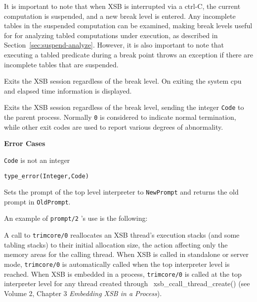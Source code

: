 \begin{description}
It is important to note that when XSB is interrupted via a ctrl-C, the
current computation is suspended, and a new break level is entered.
Any incomplete tables in the suspended computation can be examined,
making break levels useful for for analyzing tabled computations under
execution, as described in Section~\ref{sec:suspend-analyze}.
However, it is also important to note that executing a tabled
predicate during a break point throws an exception if there are
incomplete tables that are suspended.



%
    Exits the XSB session regardless of the break level.  On exiting
    the system cpu and elapsed time information is displayed.

%
Exits the XSB session regardless of the break level, sending the
integer {\tt Code} to the parent process.  Normally {\tt 0} is
considered to indicate normal termination, while other exit codes are
used to report various degrees of abnormality.

{\bf Error Cases}
\bi
\item 	{\tt Code} is not an integer
\bi
\item 	{\tt type\_error(Integer,Code)}
\ei
\ei

    Sets the prompt of the top level interpreter to {\tt NewPrompt} and 
    returns the old prompt in {\tt OldPrompt}.

    An example of {\tt prompt/2} 's use is the following:


%
A call to {\tt trimcore/0} reallocates an XSB thread's execution
stacks (and some tabling stacks) to their initial allocation size, the
action affecting only the memory areas for the calling thread.  When
XSB is called in standalone or server mode, {\tt trimcore/0} is
automatically called when the top interpreter level is reached.  When
XSB is embedded in a process, {\tt trimcore/0} is called at the top
interpreter level for any thread created through
{\ xsb\_ccall\_thread\_create()} (see Volume 2, Chapter 3 {\em
  Embedding XSB in a Process}).


\end{description}
